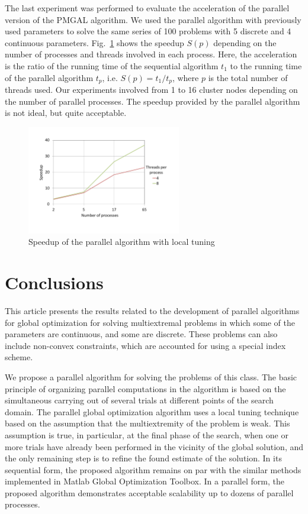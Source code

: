 \documentclass[
11pt,%
tightenlines,%
twoside,%
onecolumn,%
nofloats,%
nobibnotes,%
nofootinbib,%
superscriptaddress,%
noshowpacs,%
centertags]%
{revtex4}
\begin{document}
The last experiment was performed to evaluate the acceleration of the parallel version of the PMGAL algorithm. 
We used the parallel algorithm with previously used parameters to solve the same series of 100 problems with 5 discrete and 4 continuous parameters.
Fig.~\ref{fig:3} shows the speedup $S(p)$ depending on the number of processes and threads involved in each process. Here, the acceleration is the ratio of the running time of the sequential algorithm  $t_1$ to the running time of the parallel algorithm $t_p$, i.e. $S(p) = t_1/t_p$, where $p$ is the total number of threads used.
Our experiments involved from 1 to 16 cluster nodes depending on the number of parallel processes. The speedup provided by the parallel algorithm is not ideal, but quite acceptable.

\begin{figure}[ht]
    \centering
    \includegraphics[width=0.6\textwidth]{speedup.pdf}
    \caption{Speedup of the parallel algorithm with local tuning}
    \label{fig:3}
\end{figure}




\section{Conclusions}

This article presents the results related to the development of parallel algorithms for global optimization for solving multiextremal problems in which some of the parameters are continuous, and some are discrete. 
These problems can also include non-convex constraints, which are accounted for using a special index scheme.

We propose a parallel algorithm for solving the problems of this class. The basic principle of organizing parallel computations in the algorithm is based on the simultaneous carrying out of several trials at different points of the search domain.
The parallel global optimization algorithm uses a local tuning technique based on the assumption that the multiextremity of the problem is weak. This assumption is true, in particular, at the final phase of the search, when one or more trials have already been performed in the vicinity of the global solution, and the only remaining step is to refine the found estimate of the solution.
In its sequential form, the proposed algorithm remains on par with the similar methods implemented in Matlab Global Optimization Toolbox. 
In a parallel form, the proposed algorithm demonstrates acceptable scalability up to dozens of parallel processes.
\end{document}
